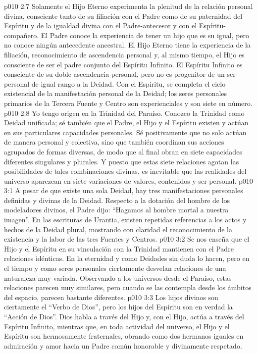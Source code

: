 \vs p010 2:7 \pc Solamente el Hijo Eterno experimenta la plenitud de la relación personal divina, consciente tanto de su filiación con el Padre como de su paternidad del Espíritu y de la igualdad divina con el Padre\hyp{}antecesor y con el Espíritu\hyp{}compañero. El Padre conoce la experiencia de tener un hijo que es su igual, pero no conoce ningún antecedente ancestral. El Hijo Eterno tiene la experiencia de la filiación, reconocimiento de ascendencia personal y, al mismo tiempo, el Hijo es consciente de ser el padre conjunto del Espíritu Infinito. El Espíritu Infinito es consciente de su doble ascendencia personal, pero no es progenitor de un ser personal de igual rango a la Deidad. Con el Espíritu, se completa el ciclo existencial de la manifestación personal de la Deidad; los seres personales primarios de la Tercera Fuente y Centro son experienciales y son siete en número.
\vs p010 2:8 Yo tengo origen en la Trinidad del Paraíso. Conozco la Trinidad como Deidad unificada; sé también que el Padre, el Hijo y el Espíritu existen y actúan en sus particulares capacidades personales. Sé positivamente que no solo actúan de manera personal y colectiva, sino que también coordinan sus acciones agrupados de formas diversas, de modo que al final obran en siete capacidades diferentes singulares y plurales. Y puesto que estas siete relaciones agotan las posibilidades de tales combinaciones divinas, es inevitable que las realidades del universo aparezcan en siete variaciones de valores, contenidos y ser personal.
\vs p010 3:1 A pesar de que existe una sola Deidad, hay tres manifestaciones personales definidas y divinas de la Deidad. Respecto a la dotación del hombre de los modeladores divinos, el Padre dijo: “Hagamos al hombre mortal a nuestra imagen”. En las escrituras de Urantia, existen repetidas referencias a los actos y hechos de la Deidad plural, mostrando con claridad el reconocimiento de la existencia y la labor de las tres Fuentes y Centros.
\vs p010 3:2 \pc Se nos enseña que el Hijo y el Espíritu en su vinculación con la Trinidad mantienen con el Padre relaciones idénticas. En la eternidad y como Deidades sin duda lo hacen, pero en el tiempo y como seres personales ciertamente desvelan relaciones de una naturaleza muy variada. Observando a los universos desde el Paraíso, estas relaciones parecen muy similares, pero cuando se las contempla desde los ámbitos del espacio, parecen bastante diferentes.
\vs p010 3:3 Los hijos divinos son ciertamente el “Verbo de Dios”, pero los hijos del Espíritu son en verdad la “Acción de Dios”. Dios habla a través del Hijo y, con el Hijo, actúa a través del Espíritu Infinito, mientras que, en toda actividad del universo, el Hijo y el Espíritu son hermosamente fraternales, obrando como dos hermanos iguales en admiración y amor hacia un Padre común honorable y divinamente respetado.
